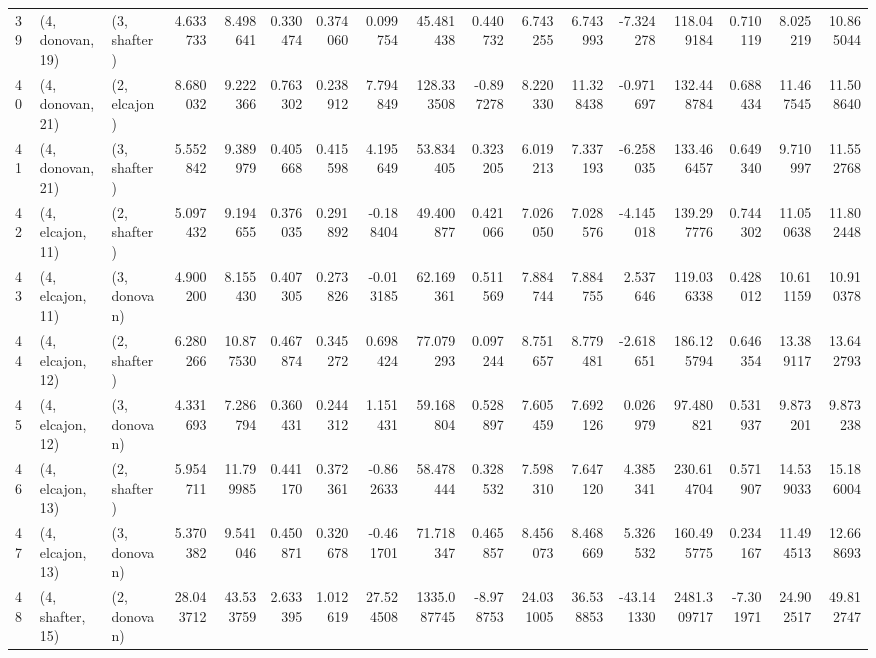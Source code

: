 \begin{tabular}{lllrrrrrrrrrrrrrr}
39 &  (4, donovan, 19) &     (3, shafter) &   4.633733 &   8.498641 &   0.330474 &  0.374060 &   0.099754 &    45.481438 &   0.440732 &   6.743255 &   6.743993 &  -7.324278 &   118.049184 &  0.710119 &   8.025219 &  10.865044 \\
40 &  (4, donovan, 21) &     (2, elcajon) &   8.680032 &   9.222366 &   0.763302 &  0.238912 &   7.794849 &   128.333508 &  -0.897278 &   8.220330 &  11.328438 &  -0.971697 &   132.448784 &  0.688434 &  11.467545 &  11.508640 \\
41 &  (4, donovan, 21) &     (3, shafter) &   5.552842 &   9.389979 &   0.405668 &  0.415598 &   4.195649 &    53.834405 &   0.323205 &   6.019213 &   7.337193 &  -6.258035 &   133.466457 &  0.649340 &   9.710997 &  11.552768 \\
42 &  (4, elcajon, 11) &     (2, shafter) &   5.097432 &   9.194655 &   0.376035 &  0.291892 &  -0.188404 &    49.400877 &   0.421066 &   7.026050 &   7.028576 &  -4.145018 &   139.297776 &  0.744302 &  11.050638 &  11.802448 \\
43 &  (4, elcajon, 11) &     (3, donovan) &   4.900200 &   8.155430 &   0.407305 &  0.273826 &  -0.013185 &    62.169361 &   0.511569 &   7.884744 &   7.884755 &   2.537646 &   119.036338 &  0.428012 &  10.611159 &  10.910378 \\
44 &  (4, elcajon, 12) &     (2, shafter) &   6.280266 &  10.877530 &   0.467874 &  0.345272 &   0.698424 &    77.079293 &   0.097244 &   8.751657 &   8.779481 &  -2.618651 &   186.125794 &  0.646354 &  13.389117 &  13.642793 \\
45 &  (4, elcajon, 12) &     (3, donovan) &   4.331693 &   7.286794 &   0.360431 &  0.244312 &   1.151431 &    59.168804 &   0.528897 &   7.605459 &   7.692126 &   0.026979 &    97.480821 &  0.531937 &   9.873201 &   9.873238 \\
46 &  (4, elcajon, 13) &     (2, shafter) &   5.954711 &  11.799985 &   0.441170 &  0.372361 &  -0.862633 &    58.478444 &   0.328532 &   7.598310 &   7.647120 &   4.385341 &   230.614704 &  0.571907 &  14.539033 &  15.186004 \\
47 &  (4, elcajon, 13) &     (3, donovan) &   5.370382 &   9.541046 &   0.450871 &  0.320678 &  -0.461701 &    71.718347 &   0.465857 &   8.456073 &   8.468669 &   5.326532 &   160.495775 &  0.234167 &  11.494513 &  12.668693 \\
48 &  (4, shafter, 15) &     (2, donovan) &  28.043712 &  43.533759 &   2.633395 &  1.012619 &  27.524508 &  1335.087745 &  -8.978753 &  24.031005 &  36.538853 & -43.141330 &  2481.309717 & -7.301971 &  24.902517 &  49.812747 \\

\end{tabular}
